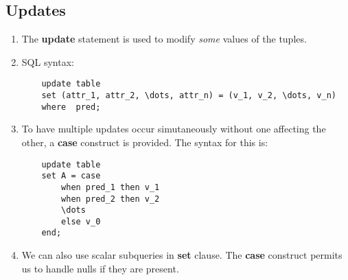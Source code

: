\documentclass[journal,12pt,twocolumn]{IEEEtran}
\begin{document}
\subsection{Updates}
\begin{enumerate}
    \item The \textbf{update} statement is used to modify \textit{some} values 
    of the tuples.
    \item SQL syntax:
    \begin{lstlisting}
    update table
    set (attr_1, attr_2, \dots, attr_n) = (v_1, v_2, \dots, v_n)
    where  pred;
    \end{lstlisting}
    \item To have multiple updates occur simutaneously without one affecting 
    the other, a \textbf{case} construct is provided. The syntax for this is:
    \begin{lstlisting}
    update table
    set A = case
        when pred_1 then v_1
        when pred_2 then v_2
        \dots
        else v_0
    end;
    \end{lstlisting}
    \item We can also use scalar subqueries in \textbf{set} clause. The 
    \textbf{case} construct permits us to handle nulls if they are present.
\end{enumerate}
\end{document}
